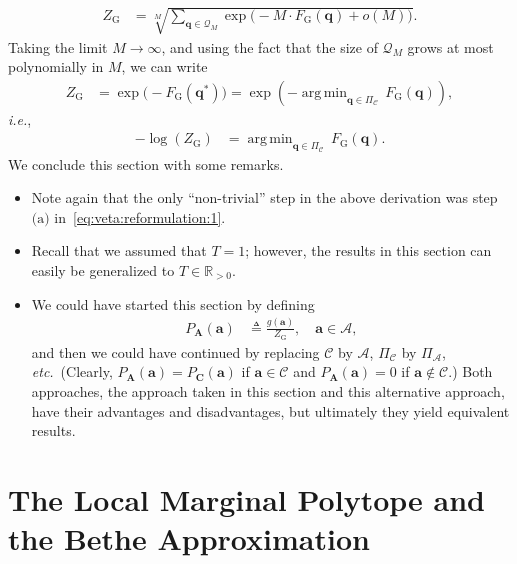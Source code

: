 \documentclass[journal, twocolumn]{IEEEtran}
\renewcommand{\mathbf}[1]{{\bm{#1}}}
\newcommand{\ie}{\emph{i.e.}}
\newcommand{\etc}{\emph{etc.}}
\newcommand{\Rpp}{\mathbb{R}_{>0}}
\newcommand{\vect}[1]{\mathbf{#1}}
\newcommand{\code}[1]{\mathcal{#1}}
\newcommand{\set}[1]{\mathcal{#1}}
\DeclareMathOperator*{\argmin}{arg\,min}
\newcommand{\defeq}{\triangleq}
\newcommand{\onestar}{\text{(a)}}
\newcommand{\codeCedge}{\code{C}}
\newcommand{\setA}{\set{A}}
\newcommand{\vA}{\vect{A}}
\newcommand{\va}{\vect{a}}
\newcommand{\vC}{\vect{C}}
\newcommand{\vq}{\vect{q}}
\newcommand{\?}{\mathrm{?}}
\newcommand{\setQsample}[1]{\set{Q}_{#1}}
\newcommand{\FGibbs}{F_{\mathrm{G}}}
\newcommand{\ZGibbs}{Z_{\mathrm{G}}}
\newcommand{\setPi}{\Pi}
\begin{document}
\begin{align*}
  \ZGibbs
    &= \sqrt[M]
       {\sum_{\vq \in \setQsample{M}}
          \exp
            \big(
              - M \cdot \FGibbs(\vq)
              + o(M)
            \big)
       }.
\end{align*}
Taking the limit $M \to \infty$, and using the fact that the size of
$\setQsample{M}$ grows at most polynomially in $M$, we can write
\begin{align*}
  \ZGibbs
    &= \exp
         \big(
           - \FGibbs(\vq^{*})
         \big)
     = \exp
         \left(
           -
           \argmin_{\vq \in \setPi_{\codeCedge}} \, 
             \FGibbs(\vq)
         \right),
\end{align*}
\ie,
\begin{align*}
  -
  \log(\ZGibbs)
    &= \argmin_{\vq \in \setPi_{\codeCedge}} \, 
         \FGibbs(\vq).
\end{align*}
We conclude this section with some remarks.
\begin{itemize}

\item Note again that the only ``non-trivial'' step in the above derivation
  was step~$\onestar$ in~\eqref{eq:veta:reformulation:1}.

\item Recall that we assumed that $T = 1$; however, the results in this
  section can easily be generalized to $T \in \Rpp$.

\item We could have started this section by defining
  \begin{align*}
    P_{\vA}(\va)
      &\defeq
         \frac{g(\va)}{\ZGibbs},
           \quad \va \in \setA, 
  \end{align*}
  and then we could have continued by replacing $\codeCedge$ by $\setA$,
  $\setPi_{\codeCedge}$ by $\setPi_{\setA}$, \etc\ (Clearly, $P_{\vA}(\va) =
  P_{\vC}(\va)$ if $\va \in \codeCedge$ and $P_{\vA}(\va) = 0$ if $\va \notin
  \codeCedge$.) Both approaches, the approach taken in this section and this
  alternative approach, have their advantages and disadvantages, but
  ultimately they yield equivalent results.

\end{itemize}



\section{The Local Marginal Polytope and \\
               the Bethe Approximation}
\label{sec:local:marginal:polytope:and:Bethe:approximation:1}
\end{document}
